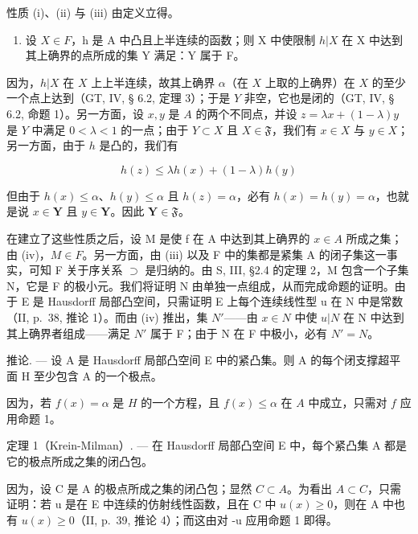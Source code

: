 性质 (i)、(ii) 与 (iii) 由定义立得。

\begin{enumerate}
\def\labelenumi{(\roman{enumi})}
\setcounter{enumi}{3}
\tightlist
\item
  设 \(X \in F\)，h 是 A 中凸且上半连续的函数；则 X 中使限制 \(h|X\) 在 X 中达到其上确界的点所成的集 Y 满足：Y 属于 F。
\end{enumerate}

因为，\(h|X\) 在 \(X\) 上上半连续，故其上确界 \(\alpha\)（在 \(X\) 上取的上确界）在 \(X\) 的至少一个点上达到（GT, IV, § 6.2, 定理 3）；于是 \(Y\) 非空，它也是闭的（GT, IV, § 6.2, 命题 1）。另一方面，设 \(x, y\) 是 \(A\) 的两个不同点，并设 \(z = \lambda x + (1 - \lambda)y\) 是 \(Y\) 中满足 \(0 < \lambda < 1\) 的一点；由于 \(Y \subset X\) 且 \(X \in \mathfrak{F}\)，我们有 \(x \in X\) 与 \(y \in X\)；另一方面，由于 \(h\) 是凸的，我们有

\[
h (z) \leqslant \lambda h (x) + (1 - \lambda) h (y)
\]

但由于 \(h(x) \leqslant \alpha\)、\(h(y) \leqslant \alpha\) 且 \(h(z) = \alpha\)，必有 \(h(x) = h(y) = \alpha\)，也就是说 \(x \in \mathbf{Y}\) 且 \(y \in \mathbf{Y}\)。因此 \(\mathbf{Y} \in \mathfrak{F}\)。

在建立了这些性质之后，设 M 是使 f 在 A 中达到其上确界的 \(x \in A\) 所成之集；由 (iv)，\(M \in F\)。另一方面，由 (iii) 以及 F 中的集都是紧集 A 的闭子集这一事实，可知 F 关于序关系 \(\supset\) 是归纳的。由 S, III, §2.4 的定理 2，M 包含一个子集 N，它是 F 的极小元。我们将证明 N 由单独一点组成，从而完成命题的证明。由于 E 是 Hausdorff 局部凸空间，只需证明 E 上每个连续线性型 u 在 N 中是常数（II, p.~38, 推论 1）。而由 (iv) 推出，集 \(N'\)——由 \(x \in N\) 中使 \(u|N\) 在 N 中达到其上确界者组成——满足 \(N'\) 属于 F；由于 N 在 F 中极小，必有 \(N' = N\)。

推论. --- 设 A 是 Hausdorff 局部凸空间 E 中的紧凸集。则 A 的每个闭支撑超平面 H 至少包含 A 的一个极点。

因为，若 \(f(x) = \alpha\) 是 \(H\) 的一个方程，且 \(f(x) \leqslant \alpha\) 在 \(A\) 中成立，只需对 \(f\) 应用命题 1。

定理 1（Krein-Milman）. --- 在 Hausdorff 局部凸空间 E 中，每个紧凸集 A 都是它的极点所成之集的闭凸包。

因为，设 C 是 A 的极点所成之集的闭凸包；显然 \(C \subset A\)。为看出 \(A \subset C\)，只需证明：若 u 是在 E 中连续的仿射线性函数，且在 C 中 \(u(x) \geqslant 0\)，则在 A 中也有 \(u(x) \geqslant 0\)（II, p.~39, 推论 4）；而这由对 -u 应用命题 1 即得。

